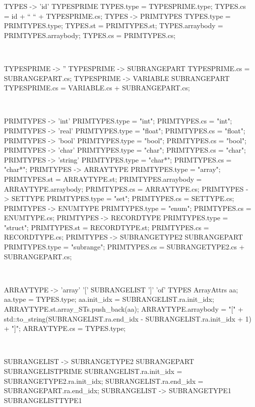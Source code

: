 \begin{verbbox}[\scriptsize]
TYPES -> 'id' TYPESPRIME
{
TYPES.type = TYPESPRIME.type;
TYPES.cs = id + “ “ + TYPESPRIME.cs;
}
TYPES -> PRIMTYPES
{
TYPES.type = PRIMTYPES.type;
TYPES.st = PRIMTYPES.st;
TYPES.arraybody = PRIMTYPES.arraybody;
TYPES.cs = PRIMTYPES.cs;
}
\end{verbbox} 
\theverbbox\\

\begin{verbbox}[\scriptsize]
TYPESPRIME -> '' {}
TYPESPRIME -> SUBRANGEPART
{
TYPESPRIME.cs = SUBRANGEPART.cs;
}
TYPESPRIME -> VARIABLE SUBRANGEPART
{
TYPESPRIME.cs = VARIABLE.cs + SUBRANGEPART.cs;
}
\end{verbbox} 
\theverbbox\\

\begin{verbbox}[\scriptsize]
PRIMTYPES -> 'int'
{
PRIMTYPES.type = "int";
PRIMTYPES.cs = "int";
}
PRIMTYPES -> 'real'
{
PRIMTYPES.type = "float";
PRIMTYPES.cs = "float";
}
PRIMTYPES -> 'bool'
{
PRIMTYPES.type = "bool";
PRIMTYPES.cs = "bool";
}
PRIMTYPES -> 'char'
{
PRIMTYPES.type = "char";
PRIMTYPES.cs = "char";
}
PRIMTYPES -> 'string'
{
PRIMTYPES.type = "char*";
PRIMTYPES.cs = "char*";
}
PRIMTYPES -> ARRAYTYPE
{
PRIMTYPES.type = "array";
PRIMTYPES.st = ARRAYTYPE.st;
PRIMTYPES.arraybody = ARRAYTYPE.arraybody;
PRIMTYPES.cs = ARRAYTYPE.cs;
}
PRIMTYPES -> SETTYPE
{
PRIMTYPES.type = "set";
PRIMTYPES.cs = SETTYPE.cs;
}
PRIMTYPES -> ENUMTYPE
{PRIMTYPES.type = "enum";
PRIMTYPES.cs = ENUMTYPE.cs;
}
PRIMTYPES -> RECORDTYPE
{
PRIMTYPES.type = "struct";
PRIMTYPES.st = RECORDTYPE.st;
PRIMTYPES.cs = RECORDTYPE.cs;
}
PRIMTYPES -> SUBRANGETYPE2 SUBRANGEPART
{
PRIMTYPES.type = "subrange";
PRIMTYPES.cs = SUBRANGETYPE2.cs + SUBRANGEPART.cs;
}
\end{verbbox} 
\theverbbox\\

\begin{verbbox}[\scriptsize]
ARRAYTYPE -> 'array' '[' SUBRANGELIST ']' 'of' TYPES
{
ArrayAttrs aa; aa.type = TYPES.type; aa.init_idx = SUBRANGELIST.ra.init_idx; 
ARRAYTYPE.st.array_STs.push_back(aa); 
ARRAYTYPE.arraybody = "[" + std::to_string(SUBRANGELIST.ra.end_idx - SUBRANGELIST.ra.init_idx + 1) + "]"; 
ARRAYTYPE.cs = TYPES.type;
}
\end{verbbox} 
\theverbbox\\

\begin{verbbox}[\scriptsize]
SUBRANGELIST -> SUBRANGETYPE2 SUBRANGEPART SUBRANGELISTPRIME
{
SUBRANGELIST.ra.init_idx = SUBRANGETYPE2.ra.init_idx; 
SUBRANGELIST.ra.end_idx = SUBRANGEPART.ra.end_idx;
}
SUBRANGELIST -> SUBRANGETYPE1 SUBRANGELISTTYPE1
\end{verbbox} 
\theverbbox\\

